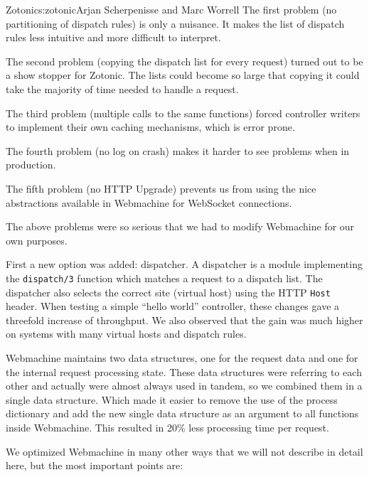 \begin{aosachapter}{Zotonic}{s:zotonic}{Arjan Scherpenisse and Marc Worrell}
The first problem (no partitioning of dispatch rules) is only a
nuisance. It makes the list of dispatch rules less intuitive and more
difficult to interpret.

The second problem (copying the dispatch list for every request) turned
out to be a show stopper for Zotonic. The lists could become so large
that copying it could take the majority of time needed to handle a
request.

The third problem (multiple calls to the same functions) forced
controller writers to implement their own caching mechanisms, which is
error prone.

The fourth problem (no log on crash) makes it harder to see problems
when in production.

The fifth problem (no HTTP Upgrade) prevents us from using the nice
abstractions available in Webmachine for WebSocket connections.

The above problems were so serious that we had to modify Webmachine for
our own purposes.

First a new option was added: dispatcher. A dispatcher is a module
implementing the \texttt{dispatch/3} function which matches a request to
a dispatch list. The dispatcher also selects the correct site (virtual
host) using the HTTP \texttt{Host} header. When testing a simple ``hello
world'' controller, these changes gave a threefold increase of
throughput. We also observed that the gain was much higher on systems
with many virtual hosts and dispatch rules.

Webmachine maintains two data structures, one for the request data and
one for the internal request processing state. These data structures
were referring to each other and actually were almost always used in
tandem, so we combined them in a single data structure. Which made it
easier to remove the use of the process dictionary and add the new
single data structure as an argument to all functions inside Webmachine.
This resulted in 20\% less processing time per request.

We optimized Webmachine in many other ways that we will not describe in
detail here, but the most important points are:

\begin{aosaitemize}


\end{aosaitemize}
\end{aosachapter}
